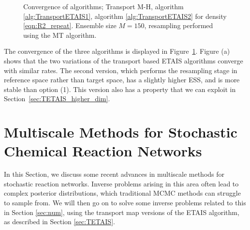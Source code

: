 \documentclass[final]{siamltex}
\begin{document}
\begin{figure}[!ht]
\centering
{}
\caption{Convergence of algorithms; Transport M-H,
  algorithm \ref{alg:TransportETAIS1}, algorithm \ref{alg:TransportETAIS2} for
  density \eqref{eqn:R2_repeat}. Ensemble size $M=150$, resampling performed using the MT algorithm.}
\label{fig:R2_l2_convergence}
\end{figure}

The convergence of the three algorithms is displayed in Figure~\ref{fig:R2_l2_convergence}. Figure (a) shows that the two variations of the transport based ETAIS algorithms converge with similar rates. The second version, which performs the resampling stage in reference space rather than target space, has a slightly higher ESS, and is more stable than option (1). This version also has a property that we can exploit in Section~\ref{sec:TETAIS_higher_dim}.



\section{Multiscale Methods for Stochastic Chemical Reaction
  Networks}\label{sec:multi}
In this Section, we discuss some recent advances in multiscale methods
for stochastic reaction networks. Inverse problems arising in this
area often lead to complex posterior
distributions, which traditional MCMC methods can struggle to sample
from. We will then go on to solve some inverse problems related to
this in Section \ref{sec:num}, using the transport map versions of the
ETAIS algorithm, as described in Section \ref{sec:TETAIS}.
\end{document}
